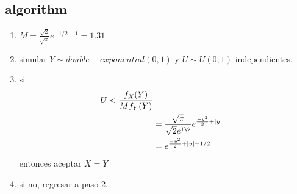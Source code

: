\documentclass[10pt, oneside]{article}
\begin{document}
\subsection{algorithm}

\begin{enumerate}
	\item $M = \frac{\sqrt{2}}{\sqrt{\pi}} e^{-1/2 + 1} = 1.31$
	\item simular $Y \sim double-exponential(0,1)$ y $U \sim U(0,1)$ independientes.
	\item si
	      \[
		      \begin{split}
			      U < \frac{f_X(Y)}{M f_Y(Y)}                                      \\
			       & = \frac{\sqrt{\pi}}{\sqrt{2}e^{1\2}} e^{\frac{-y^2}{2} + |y|} \\
			       & = e^{\frac{-y^2}{2} + |y| - 1/2}                              \\
		      \end{split}
	      \]
	      entonces aceptar $X = Y$
	\item si no, regresar a paso 2.
\end{enumerate}
\end{document}
